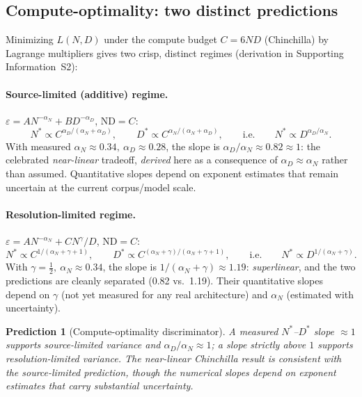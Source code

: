 \documentclass[entropy,article,submit,moreauthors,pdftex]{Definitions/mdpi}
\newtheorem{prediction}{Prediction}
\newcommand{\eps}{\varepsilon}
\begin{document}
\subsection{Compute-optimality: two distinct predictions}
Minimizing $L(N,D)$ under the compute budget $C=6ND$ (Chinchilla) by
Lagrange multipliers gives two crisp, distinct regimes (derivation in
Supporting Information~S2):

\paragraph{Source-limited (additive) regime.}
$\eps=A N^{-\alpha_N}+B D^{-\alpha_D}$, $\text{ND}=C$:
\begin{equation}
  N^* \propto C^{\alpha_D/(\alpha_N+\alpha_D)},\qquad
  D^* \propto C^{\alpha_N/(\alpha_N+\alpha_D)},
  \qquad\text{i.e.}\qquad
  N^* \propto D^{\alpha_D/\alpha_N}.
  \label{eq:sourceopt}
\end{equation}
With measured $\alpha_N\approx0.34,\ \alpha_D\approx0.28$, the slope is
$\alpha_D/\alpha_N\approx0.82\approx1$: the celebrated \emph{near-linear}
tradeoff, \emph{derived} here as a consequence of $\alpha_D\approx\alpha_N$
rather than assumed. Quantitative slopes depend on exponent estimates
that remain uncertain at the current corpus/model scale.

\paragraph{Resolution-limited regime.}
$\eps=A N^{-\alpha_N}+C N^{\gamma}/D$, $\text{ND}=C$:
\begin{equation}
  N^* \propto C^{1/(\alpha_N+\gamma+1)},\qquad
  D^* \propto C^{(\alpha_N+\gamma)/(\alpha_N+\gamma+1)},
  \qquad\text{i.e.}\qquad
  N^* \propto D^{1/(\alpha_N+\gamma)}.
  \label{eq:resolopt}
\end{equation}
With $\gamma=\frac12,\ \alpha_N\approx0.34$, the slope is
$1/(\alpha_N+\gamma)\approx1.19$: \emph{superlinear}, and the two
predictions are cleanly separated (0.82 vs.\ 1.19). Their quantitative
slopes depend on $\gamma$ (not yet measured for any real architecture) and
$\alpha_N$ (estimated with uncertainty).

\begin{prediction}[Compute-optimality discriminator]
\label{pred:compute}
A measured $N^*$--$D^*$ slope $\approx1$ supports source-limited variance and
$\alpha_D/\alpha_N\approx1$; a slope strictly above $1$ supports
resolution-limited variance. The near-linear Chinchilla result is consistent
with the source-limited prediction, though the numerical slopes depend on
exponent estimates that carry substantial uncertainty.
\end{prediction}
\end{document}

